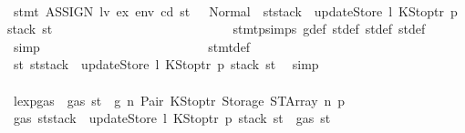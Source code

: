 \begin{isabellebody}
\ \ \ \ \ \ \ \ \ \ \ \ \ \ \ \ \ \ \ \ \ \ \ \ \isamarkupfalse%
\ {\isachardoublequoteopen}stmt\ {\isacharparenleft}{\kern0pt}ASSIGN\ lv\ ex{\isacharparenright}{\kern0pt}\ env\ cd\ st\ {\isacharequal}{\kern0pt}\ \ Normal\ {\isacharparenleft}{\kern0pt}{\isacharparenleft}{\kern0pt}{\isacharparenright}{\kern0pt}{\isacharcomma}{\kern0pt}\ st{\isacharprime}{\kern0pt}{\isacharprime}{\kern0pt}{\isacharprime}{\kern0pt}{\isasymlparr}stack\ {\isacharcolon}{\kern0pt}{\isacharequal}{\kern0pt}\ updateStore\ l\ {\isacharparenleft}{\kern0pt}KStoptr\ p{\isacharparenright}{\kern0pt}\ {\isacharparenleft}{\kern0pt}stack\ st{\isacharprime}{\kern0pt}{\isacharprime}{\kern0pt}{\isacharprime}{\kern0pt}{\isacharparenright}{\kern0pt}{\isasymrparr}{\isacharparenright}{\kern0pt}{\isachardoublequoteclose}\isanewline
\ \ \ \ \ \ \ \ \ \ \ \ \ \ \ \ \ \ \ \ \ \ \ \ \ \ \isamarkupfalse%
\ stmt{\isachardot}{\kern0pt}psimps{\isacharparenleft}{\kern0pt}{}{\isacharparenright}{\kern0pt}\ g{\isacharunderscore}{\kern0pt}def\ st{\isacharprime}{\kern0pt}{\isacharunderscore}{\kern0pt}def\ st{\isacharprime}{\kern0pt}{\isacharprime}{\kern0pt}{\isacharunderscore}{\kern0pt}def\ st{\isacharprime}{\kern0pt}{\isacharprime}{\kern0pt}{\isacharprime}{\kern0pt}{\isacharunderscore}{\kern0pt}def\ \isamarkupfalse%
\ simp\isanewline
\ \ \ \ \ \ \ \ \ \ \ \ \ \ \ \ \ \ \ \ \ \ \ \ \isamarkupfalse%
\ stmt{\isacharunderscore}{\kern0pt}def\ \isamarkupfalse%
\ {\isachardoublequoteopen}st{}{\isacharprime}{\kern0pt}{\isacharequal}{\kern0pt}\ st{\isacharprime}{\kern0pt}{\isacharprime}{\kern0pt}{\isacharprime}{\kern0pt}{\isasymlparr}stack\ {\isacharcolon}{\kern0pt}{\isacharequal}{\kern0pt}\ updateStore\ l\ {\isacharparenleft}{\kern0pt}KStoptr\ p{\isacharparenright}{\kern0pt}\ {\isacharparenleft}{\kern0pt}stack\ st{\isacharprime}{\kern0pt}{\isacharprime}{\kern0pt}{\isacharprime}{\kern0pt}{\isacharparenright}{\kern0pt}{\isasymrparr}{\isachardoublequoteclose}\ \isamarkupfalse%
\ simp\isanewline
\ \ \ \ \ \ \ \ \ \ \ \ \ \ \ \ \ \ \ \ \ \ \ \ \isamarkupfalse%
\ \isamarkupfalse%
\ lexp{\isacharunderscore}{\kern0pt}gas\ {\isacharbackquoteopen}{\isasymnot}\ gas\ st\ {\isasymle}\ g{\isacharbackquoteclose}\ n\ Pair\ KStoptr\ Storage\ STArray\ n{}\ p{}\ \isamarkupfalse%
\ {\isachardoublequoteopen}gas\ {\isacharparenleft}{\kern0pt}st{\isacharprime}{\kern0pt}{\isacharprime}{\kern0pt}{\isacharprime}{\kern0pt}{\isasymlparr}stack\ {\isacharcolon}{\kern0pt}{\isacharequal}{\kern0pt}\ updateStore\ l\ {\isacharparenleft}{\kern0pt}KStoptr\ p{\isacharparenright}{\kern0pt}\ {\isacharparenleft}{\kern0pt}stack\ st{\isacharprime}{\kern0pt}{\isacharprime}{\kern0pt}{\isacharprime}{\kern0pt}{\isacharparenright}{\kern0pt}{\isasymrparr}{\isacharparenright}{\kern0pt}\ {\isasymle}\ gas\ st{\isacharprime}{\kern0pt}{\isacharprime}{\kern0pt}{\isachardoublequoteclose}\ \isamarkupfalse%

\end{isabellebody}
